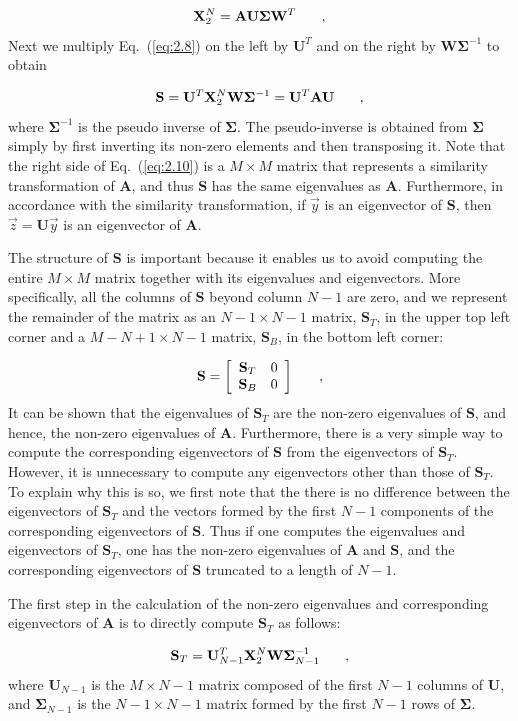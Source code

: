 \documentclass[12pt]{article}
\newcommand{\bracket}[1]{\left[ #1 \right]}
\renewcommand{\vec}[1]{\overrightarrow{#1}}
\newcommand{\be}{\begin{equation}}
\newcommand{\ee}{\end{equation}}
\newcommand{\pec}{\hspace{0.25in},}
\newcommand{\LEQ}[1]{\label{eq:#1}}
\newcommand{\EQ}[1]{Eq.~(\ref{eq:#1})}
\newcommand{\mA}{\mathbf{A}}
\newcommand{\mX}{\mathbf{X}}
\newcommand{\mU}{\mathbf{U}}
\newcommand{\mW}{\mathbf{W}}
\newcommand{\mSigma}{\mathbf{\Sigma}}
\newcommand{\mS}{\mathbf{S}}
\begin{document}
\be
	\mX_2^{N} = \mA \mU \mSigma \mW^T \pec
	\LEQ{2.8}
\ee
Next we multiply \EQ{2.8} on the left by $\mU^{T}$ and on the right by 
	$\mW\mSigma^{-1}$ to obtain 

\be
	\mS = \mU^{T}\mX_2^{N}\mW\mSigma^{-1} = \mU^{T}\mA\mU \pec
	\LEQ{2.10}
\ee
where $\mSigma^{-1}$ is the pseudo inverse of $\mSigma$.
The pseudo-inverse is obtained from $\mSigma$ simply by first inverting its 
	non-zero elements and then transposing it. 
Note that the right side of \EQ{2.10} is a $M \times M$ matrix that represents 
	a similarity transformation of $\mA$, and thus $\mS$ has the same eigenvalues 
	as $\mA$.  
Furthermore, in accordance with the similarity transformation, if $\vec{y}$ is 
	an eigenvector of $\mS$, then $\vec{z} = \mU \vec{y}$ is an eigenvector of 
	$\mA$.  

The structure of $\mS$ is important because it enables us to avoid computing 
	the entire $M \times M$ matrix together with its eigenvalues and eigenvectors.
More specifically, all the columns of $\mS$ beyond column $N-1$ are zero, and 
	we represent the remainder of the matrix as an $N-1 \times N-1$ matrix, 
	$\mS_{T}$, in the upper top left corner and a $M-N+1 \times N-1$ matrix, 
	$\mS_B$, in the bottom left corner:
 
\be
	\mS = \bracket{
	\begin{array}{cc}
		\mS_T  & 0 \\
		\mS_B & 0  
	\end{array}
	} \pec
	\LEQ{2.11}
\ee
It can be shown that the eigenvalues of $\mS_T$ are the non-zero eigenvalues of 
	$\mS$, and hence, the non-zero eigenvalues of $\mA$.  
Furthermore, there is a very simple way to compute the corresponding 
	eigenvectors of $\mS$ from the eigenvectors of $\mS_T$. 
However, it is unnecessary to compute any eigenvectors other than those of 
	$\mS_T$.  
To explain why this is so, we first note that the there is no difference 
	between the eigenvectors of $\mS_T$ and the vectors formed by the first $N-1$ 
	components of the corresponding eigenvectors of $\mS$.  
Thus if one computes the eigenvalues and eigenvectors of $\mS_T$, one has the 
	non-zero eigenvalues of $\mA$ and $\mS$, and the corresponding eigenvectors 
	of $\mS$ truncated to a length of $N-1$.

The first step in the calculation of the non-zero eigenvalues and corresponding 
	eigenvectors of $\mA$ is to directly compute $\mS_T$ as follows:

\be
	\mS_T = \mU_{N-1}^{T} \mX_{2}^{N}\mW\mSigma^{-1}_{N-1} \pec
	\LEQ{2.12}
\ee
where $\mU_{N-1}$ is the $M \times N-1$ matrix composed of the first $N-1$ 
	columns of $\mU$, and $\mSigma_{N-1}$ is the $N-1 \times N-1$ matrix formed 
	by the first $N-1$ rows of $\mSigma$.  
\end{document}
